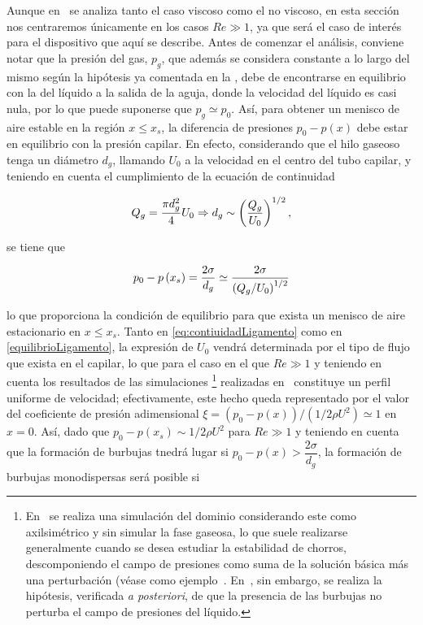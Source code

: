 Aunque en~\cite{Evangelio2015b} se analiza tanto el caso viscoso como el no viscoso, en esta sección nos centraremos únicamente en los casos $Re \gg 1$, ya que será el caso de interés para el dispositivo que aquí se describe. Antes de comenzar el análisis, conviene notar que la presión del gas, $p_{g}$, que además se considera constante a lo largo del mismo según la hipótesis ya comentada en la , debe de encontrarse en equilibrio con la del líquido a la salida de la aguja, donde la velocidad del líquido es casi nula, por lo que puede suponerse que $p_{g} \simeq p_{0}$. Así, para obtener un menisco de aire estable en la región $x \leq x_{s}$, la diferencia de presiones $p_{0} - p\left(x\right)$ debe estar en equilibrio con la presión capilar. En efecto, considerando que el hilo gaseoso tenga un diámetro $d_{g}$, llamando $U_{0}$ a la velocidad en el centro del tubo capilar, y teniendo en cuenta el cumplimiento de la ecuación de continuidad

\begin{equation}
Q_{g} = \dfrac{\pi d_{g}^{2}}{4}U_{0} \Rightarrow d_{g} \sim \left(\dfrac{Q_{g}}{U_{0}}\right)^{1/2}
\LABEQ{continuidadLigamento}, 
\end{equation}

se tiene que 

\begin{equation}
p_{0} - p\left(x_{s}\right) = \dfrac{2\sigma}{d_{g}} \simeq \dfrac{2\sigma}{\left(Q_{g}/U_{0}\right)^{1/2}}
\LABEQ{equilibrioLigamento}
\end{equation}

lo que proporciona la condición de equilibrio para que exista un menisco de aire estacionario en $x \leq x_{s}$. Tanto en \eqref{eq:contiuidadLigamento} como en \eqref{equilibrioLigamento}, la expresión de $U_{0}$ vendrá determinada por el tipo de flujo que exista en el capilar, lo que para el caso en el que $Re \gg 1$ y teniendo en cuenta los resultados de las simulaciones
\footnote{En~\cite{Evangelio2015b} se realiza una simulación del dominio considerando este como axilsimétrico y sin simular la fase gaseosa, lo que suele realizarse generalmente cuando se desea estudiar la estabilidad de chorros, descomponiendo el campo de presiones como suma de la solución básica más una perturbación (véase como ejemplo~\cite{Gordillo2014a}. En~\cite{Evangelio2015b}, sin embargo, se realiza la hipótesis, verificada \textit{a posteriori}, de que la presencia de las burbujas no perturba el campo de presiones del líquido.} realizadas en~\cite{Evangelio2015b} constituye un perfil uniforme de velocidad; efectivamente, este hecho queda representado por el valor del coeficiente de presión adimensional $\xi = \left(p_{0} - p\left(x\right)\right)/\left(1/2 \rho U^{2}\right) \simeq 1$ en $x = 0$. Así, dado que $p_{0} - p\left(x_{s}\right) \sim 1/2\rho U^{2}$ para $Re \gg 1$ y teniendo en cuenta que la formación de burbujas tnedrá lugar si $p_{0}-p\left(x\right) > \dfrac{2\sigma}{d_{g}}$, la formación de burbujas monodispersas será posible si 


